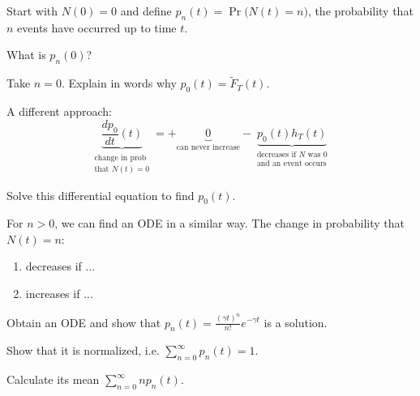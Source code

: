 \begin{slide}
\question \label{ex-poisson}


Start with $N(0) = 0$ and define $p_n(t) = \Pr\big( N(t)=n \big)$, the probability that $n$ events have occurred up to time $t$.


\begin{slidesonly}
	\bigskip
\end{slidesonly}

\begin{parts}
	\item What is $p_n(0)$?
	\item Take $n=0$. Explain in words why $p_0(t) = \tilde{F}_T(t)$.

	\item A different approach:
	\[ 
		\underbrace{\frac{d p_0}{dt}(t)}_{\substack{\text{change in prob}\\\text{that $N(t)=0$}}}
		 = +\underbrace{0}_{\text{can never increase}}
		 -\underbrace{p_{0}(t) h_T(t)}_{\substack{\text{decreases if $N$ was $0$}\\\text{and an event occurs}}}
	\]

	Solve this differential equation to find $p_0(t)$.

	\item For $n>0$, we can find an ODE in a similar way. The change in probability that $N(t)=n$:
	\begin{enumerate}
		\item decreases if ...
		\item increases if ...
	\end{enumerate}
	
	\item Obtain an ODE and show that $p_n(t) = \frac{(\gamma t)^n}{n!} e^{-\gamma t}$ is a solution.
	
	\item Show that it is normalized, i.e. $\displaystyle\sum_{n=0}^\infty p_n(t) = 1$.

	\item Calculate its mean $\displaystyle\sum_{n=0}^\infty n p_n(t)$.
	
	
\end{parts}

	
\end{slide}


